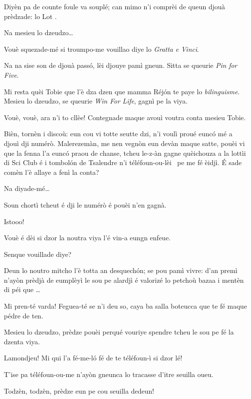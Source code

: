 \begin{drama}
\DzeudzoSenliquerspeaks Diyèn pa de counte foule va souplé; can mimo n’i comprèi de queun djouà prèdzade: lo Lot \lotto.

\Tobiespeaks Na mesieu lo dzeudzo\ldots

\DzeudzoSenliquerspeaks Vouè squezade-mé si troumpo-me vouillao diye lo \textit{Gratta e Vinci}.

\Tobiespeaks Na na sise son de djouà passó, lèi djouye pamì gneun. Sitta se queurie \textit{Pin for Five}.

\Bertinaspeaks Mi resta quèi Tobie que l’è dza dzen que mamma Réjón te paye lo \textit{bilinguisme}.  Mesieu lo dzeudzo, se queurie \textit{Win For Life}, gagnì pe la viya.

\DzeudzoSenliquerspeaks Vouè, vouè, ara n’i to cllèe! Contegnade maque avouì voutra conta mesieu Tobie.

\Tobiespeaks Bièn, tornèn i discoù: eun cou vi totte seutte dzi, n’i voulì proué eunc\'o mé a djouì  dji numérò. Malerezemàn, me nen vegnòn eun devàn maque satte, pouèi vi que la fenna l'a eunc\'o praou de chanse, tcheu le-z-àn gagne quèichouza a la lottìi di Sci Club é i tombol\'on de Tsalendre n’i téléfoun-ou-lèi \chiamare\ pe me fé èidjì. É sade comèn l’è allaye a fenì la conta?

\DzeudzoSenliquerspeaks Na diyade-mé\ldots

\Tobiespeaks Soun chortì tcheut é dji le numérò é pouèi n’en gagnà.

\DzeudzoSenliquerspeaks Istooo!

\Bertinaspeaks Vouè é dèi si dzor la noutra viya l’é vin-a eungn enfeue.

\DzeudzoSenliquerspeaks Senque vouillade diye?

\Bertinaspeaks Deun lo noutro mitcho l’è totta an desquechón; se pou pamì vivre: d'an premì n’ayòn prèdjà de eumplèyì le sou pe alardjì é valorizé lo petchoù bazaa i mentèn di péi que \ldots

\Tobiespeaks Mi pren-té varda! Feguea-té se n’i deu so, caya ba salla boteucca que te fé maque pédre de ten.

\Bertinaspeaks Mesieu lo dzeudzo, prèdze pouèi perqué vouriye spendre tcheu le sou pe fé la dzenta viya.

\Tobiespeaks Lamondjeu! Mi qui l'a fé-me-l\'o fé de te téléfoun-ì si dzor lé!

\Bertinaspeaks T'ise pa téléfoun-ou-me n’ayòn gneunca lo tracasse d’itre seuilla oueu.

\DzeudzoSenliquerspeaks {} Todzèn, todzèn, prèdze eun pe cou seuilla dedeun!


\end{drama}
